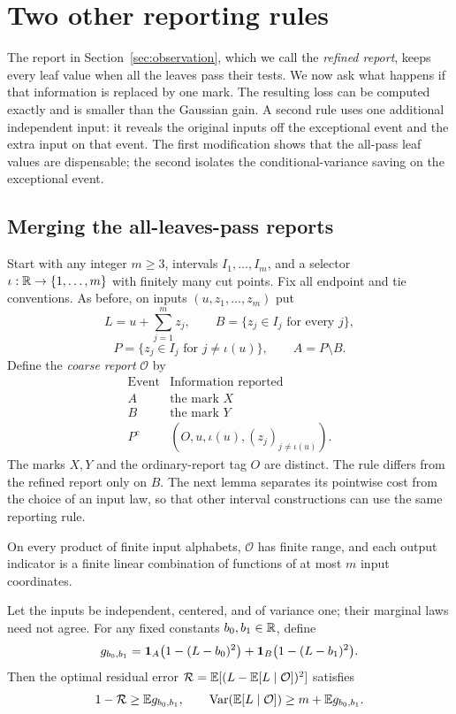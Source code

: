 \section{Two other reporting rules}\label{sec:alternatives}

The report in Section~\ref{sec:observation}, which we call the
\emph{refined report}, keeps every leaf value when all the leaves pass
their tests. We now ask what happens if that information is replaced by one
mark. The resulting loss can be computed exactly and is smaller than
the Gaussian gain. A second rule uses one additional independent input:
it reveals the original inputs off the exceptional event and the extra
input on that event. The first modification shows that the all-pass
leaf values are dispensable; the second isolates the conditional-variance
saving on the exceptional event.

\subsection{Merging the all-leaves-pass reports}\label{subsec:coarse-mark}

Start with any integer $m\ge3$, intervals $I_1,\ldots,I_m$, and a
selector $\iota:\mathbb R\to\{1,\ldots,m\}$ with finitely many cut points.
Fix all endpoint and tie conventions. As before, on inputs
$(u,z_1,\ldots,z_m)$ put
\[
 L=u+\sum_{j=1}^m z_j,\qquad
 B=\{z_j\in I_j\text{ for every }j\},
\]
\[
 P=\{z_j\in I_j\text{ for }j\ne\iota(u)\},\qquad
 A=P\setminus B.
\]
Define the \emph{coarse report} $\mathcal O$ by
\[
\begin{array}{c|l}
 \text{Event}&\text{Information reported}\\ \hline
 A&\text{the mark }X\\
 B&\text{the mark }Y\\
 P^c&(O,u,\iota(u),(z_j)_{j\ne\iota(u)}).
\end{array}
\]
The marks $X,Y$ and the ordinary-report tag $O$ are distinct. The rule
differs from the refined report only on $B$. The next lemma separates
its pointwise cost from the choice of an input law, so that other
interval constructions can use the same reporting rule.

\begin{lemma}\label{lem:coarse-report}
On every product of finite input alphabets, $\mathcal O$ has finite
range, and each output indicator is a finite linear combination of
functions of at most $m$ input coordinates.

Let the inputs be independent, centered, and of variance one; their
marginal laws need not agree. For any fixed constants $b_0,b_1\in\mathbb R$,
define
\begin{equation}\label{eq:coarse-deficit}
 g_{b_0,b_1}
 =\mathbf 1_A\bigl(1-(L-b_0)^2\bigr)
   +\mathbf 1_B\bigl(1-(L-b_1)^2\bigr).
\end{equation}
Then the optimal residual error
$\mathcal R=\mathbb E[(L-\mathbb E[L\mid\mathcal O])^2]$ satisfies
\begin{equation}\label{eq:coarse-residual}
 1-\mathcal R\ge\mathbb E g_{b_0,b_1},\qquad
 \operatorname{Var}(\mathbb E[L\mid\mathcal O])\ge m+\mathbb E g_{b_0,b_1}.
\end{equation}
\end{lemma}

